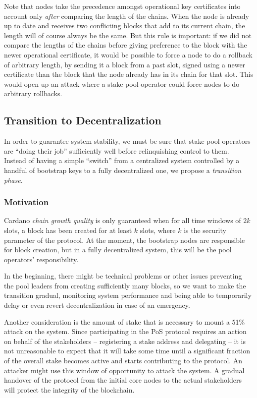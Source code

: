 \documentclass[11pt,a4paper,dvipsnames,twosided]{article}
\begin{document}
Note that nodes take the precedence amongst operational key certificates into
account only \emph{after} comparing the length of the chains. When the node is
already up to date and receives two conflicting blocks that add to its current
chain, the length will of course always be the same. But this rule is important:
if we did not compare the lengths of the chains before giving preference to the
block with the newer operational certificate, it would be possible to force a
node to do a rollback of arbitrary length, by sending it a block from a past
slot, signed using a newer certificate than the block that the node already has
in its chain for that slot. This would open up an attack where a stake pool
operator could force nodes to do arbitrary rollbacks.

\subsection{Transition to Decentralization}
\label{transition-to-decentralization}

In order to guarantee system stability, we must be sure that stake pool
operators are ``doing their job'' sufficiently well before relinquishing
control to them. Instead of having a simple ``switch'' from a
centralized system controlled by a handful of bootstrap keys to a fully
decentralized one, we propose a \emph{transition phase}.

\subsubsection{Motivation}
\label{motivation}

Cardano \emph{chain growth quality} is only guaranteed when for all time windows
of \(2k\) slots, a block has been created for at least \(k\) slots, where \(k\)
is the security parameter of the protocol. At the moment, the bootstrap nodes
are responsible for block creation, but in a fully decentralized system, this
will be the pool operators' responsibility.

In the beginning, there might be technical problems or other issues
preventing the pool leaders from creating sufficiently many blocks, so
we want to make the transition gradual, monitoring system performance
and being able to temporarily delay or even revert decentralization in
case of an emergency.

Another consideration is the amount of stake that is necessary to mount
a 51\% attack on the system. Since participating in the PoS protocol
requires an action on behalf of the stakeholders -- registering a
stake address and delegating -- it is not unreasonable to expect that it
will take some time until a significant fraction of the overall stake
becomes active and starts contributing to the protocol. An attacker
might use this window of opportunity to attack the system. A gradual
handover of the protocol from the initial core nodes to the actual
stakeholders will protect the integrity of the blockchain.
\end{document}
